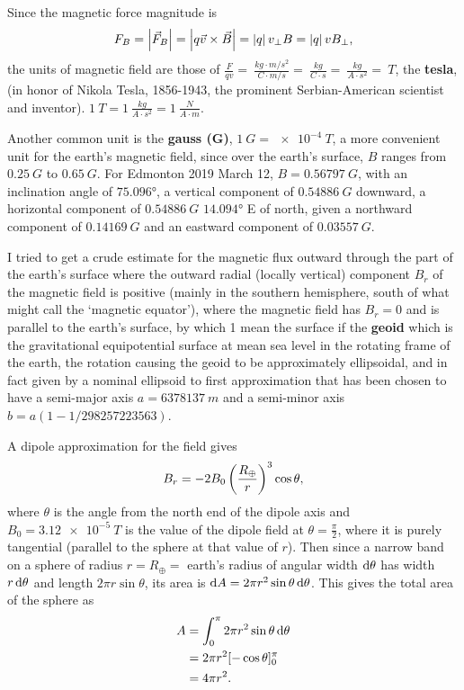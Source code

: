 Since the magnetic force magnitude is
\begin{equation}
F_B = \left| \vec{F}_B \right| = \left| q \vec{v} \times \vec{B} \right| = \left| q \right| v_\perp B = \left| q \right| v B_\perp ,
\end{equation}
the units of magnetic field are those of $\frac{F}{qv} = \SI{}{\frac{kg \cdot m/s^2}{C \cdot m/s} = \SI{}{\frac{kg}{C \cdot s}} = \SI{}{\frac{kg}{A \cdot s^2}} = \SI{}{T}}$, the \textbf{tesla}, (in honor of Nikola Tesla, 1856-1943, the prominent Serbian-American scientist and inventor). $\SI{1}{T} = \SI{1}{\frac{kg}{A \cdot s^2}} = \SI{1}{\frac{N}{A \cdot m}}$. 

Another common unit is the \textbf{gauss (G)}, $\SI{1}{G} = \SI{e-4}{T}$, a more convenient unit for the earth's magnetic field, since over the earth's surface, $B$ ranges from $\SI{0.25}{G}$ to $\SI{0.65}{G}$. For Edmonton 2019 March 12, $B = \SI{0.56797}{G}$, with an inclination angle of $\ang{75.096}$, a vertical component of $\SI{0.54886}{G}$ downward, a horizontal component of $\SI{0.54886}{G}$ $\ang{14.094}$ E of north, given a northward component of $\SI{0.14169}{G}$ and an eastward component of $\SI{0.03557}{G}$.

I tried to get a crude estimate for the magnetic flux outward through the part of the earth's surface where the outward radial (locally vertical) component $B_r$ of the magnetic field is positive (mainly in the southern hemisphere, south of what might call the `magnetic equator'), where the magnetic field has $B_r = 0$ and is parallel to the earth's surface, by which 1 mean the surface if the \textbf{geoid} which is the gravitational equipotential surface at mean sea level in the rotating frame of the earth, the rotation causing the geoid to be approximately ellipsoidal, and in fact given by a nominal ellipsoid to first approximation that has been chosen to have a semi-major axis $a = \SI{6378137}{m}$ and a semi-minor axis $b=a(1-1/298257223563)$.

A dipole approximation for the field gives
\begin{equation}
B_r = -2B_0\left(\frac{R_\oplus}{r}\right)^3 \cos \theta,
\end{equation}
where $\theta$ is the angle from the north end of the dipole axis and $B_0 = \SI{3.12e-5}{T}$ is the value of the dipole field at $\theta = \frac{\pi}{2}$, where it is purely tangential (parallel to the sphere at that value of $r$). Then since a narrow band on a sphere of radius $r = R_\oplus =$ earth's radius of angular width $\operatorname{d\!} \theta$ has width $r \operatorname{d\!} \theta$ and length $2 \pi r \sin \theta$, its area is $\operatorname{d\!} A = 2 \pi r^2 \sin \theta \operatorname{d\!} \theta$. This gives the total area of the sphere as
\begin{align*}
A &= \int_0^{\pi} 2\pi r^2 \sin\theta \operatorname{d\!} \theta \\
&= 2\pi r^2 [-\cos\theta]_0^\pi \\
&= 4\pi r^2.
\end{align*}

